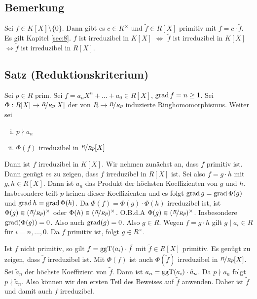 \subsection[Bemerkung: Erkenntnisse zu primitiven Polynomen aus Kapitel \ref{sec:8}]{Bemerkung} %
\label{sub:92}
Sei $f \in K[X]\setminus \{0\}$. Dann gibt es $c \in K^\times$ und $\tilde f  \in R[X]$ primitiv mit $f = c \cdot \tilde f$. Es gilt Kapitel \ref{sec:8}.
$f$ ist irreduzibel in $K[X]$ $\iff$ $\tilde f $ ist irreduzibel in $K[X]$ $\iff \tilde f$ ist irreduzibel in $R[X]$.

\subsection{Satz (Reduktionskriterium)} %
\label{sub:93}
Sei $p \in R$ prim. Sei $f = a_n X^n + \ldots + a_0 \in R[X]$, $\operatorname{grad} f = n \ge 1$. Sei $\Phi : R[X] \to \nicefrac{R}{Rp}[X]$ der von $R \to \nicefrac{R}{Rp}$ induzierte
Ringhomomorphismus. Weiter sei
\begin{enumerate}[(i)]
	\item $p \nmid a_n$
	\item $\Phi (f) $ irreduzibel in $\nicefrac{R}{Rp}[X]$
\end{enumerate}
Dann ist $f$ irreduzibel in $K[X]$.
Wir nehmen zunächst an, dass $f$ primitiv ist. Dann genügt es zu zeigen, dass $f$ irreduzibel in $R[X]$ ist. Sei also $f=g \cdot h$ mit $g,h \in R[X]$. Dann ist $a_n$ das
Produkt der höchsten Koeffizienten von $g$ und $h$. Insbesondere teilt $p$ keinen dieser Koeffizienten und es folgt $\operatorname{grad} g = \operatorname{grad} \Phi (g)$ und 
$\operatorname{grad} h = \operatorname{grad} \Phi(h)$. Da $\Phi (f)= \Phi (g) \cdot \Phi(h)$ irreduzibel ist, ist $\Phi (g) \in (\nicefrac{R}{Rp})^\times $ oder 
$\Phi (h) \in (\nicefrac{R}{Rp})^\times$. O.B.d.A $\Phi (g) \in (\nicefrac{R}{Rp})^\times $. Insbesondere $\operatorname{grad} (\Phi (g)) =0$. Also auch $\operatorname{grad} (g) =0$.
Also $g \in R$. Wegen $f=g \cdot h$ gilt $g \mid a_i \in R$ für $i=n, \ldots ,0$. Da $f$ primitiv ist, folgt $g \in R^\times$. 

Ist $f$ nicht primitiv, so gilt $f= \operatorname{ggT}(a_i) \cdot \tilde f$ mit $\tilde f \in R[X]$ primitiv. Es genügt zu zeigen, dass $\tilde f$ irreduzibel ist. Mit $\Phi (f)$ ist 
auch $\Phi(\tilde f)$ irreduzibel in $\nicefrac{R}{Rp}[X]$. Sei $\tilde a_n$ der höchste Koeffizient von $\tilde f$. Dann ist $a_n = \operatorname{ggT}(a_i) \cdot \tilde a_n$. Da
$p \nmid a_n$ folgt $p \nmid \tilde a_n$. Also können wir den ersten Teil des Beweises auf $\tilde f$ anwenden. Daher ist $\tilde f$ und damit auch $f$ irreduzibel. 
\bewende

